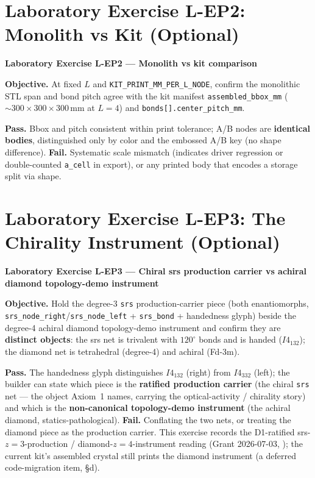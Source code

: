 \section{Laboratory Exercise L-EP2: Monolith vs Kit (Optional)}
\label{sec:vol9_lab_LEP2}

\begin{exercisebox}
\textbf{Laboratory Exercise L-EP2 --- Monolith vs kit comparison}

\textbf{Objective.} At fixed $L$ and \texttt{KIT\_PRINT\_MM\_PER\_L\_NODE}, confirm the monolithic STL span and bond pitch agree with the kit manifest \texttt{assembled\_bbox\_mm} ($\sim\!300\times300\times300\,\mathrm{mm}$ at $L=4$) and \texttt{bonds[].center\_pitch\_mm}.

\textbf{Pass.} Bbox and pitch consistent within print tolerance; A/B nodes are \textbf{identical bodies}, distinguished only by color and the embossed A/B key (no shape difference). \textbf{Fail.} Systematic scale mismatch (indicates driver regression or double-counted \texttt{a\_cell} in export), or any printed body that encodes a storage split via shape.
\end{exercisebox}

\section{Laboratory Exercise L-EP3: The Chirality Instrument (Optional)}
\label{sec:vol9_lab_LEP3}

\begin{exercisebox}
\textbf{Laboratory Exercise L-EP3 --- Chiral srs production carrier vs achiral diamond topology-demo instrument}

\textbf{Objective.} Hold the degree-3 \texttt{srs} production-carrier piece (both enantiomorphs, \texttt{srs\_node\_right}/\texttt{srs\_node\_left} + \texttt{srs\_bond} + handedness glyph) beside the degree-4 achiral diamond topology-demo instrument and confirm they are \textbf{distinct objects}: the srs net is trivalent with $120^\circ$ bonds and is handed ($I4_132$); the diamond net is tetrahedral (degree-4) and achiral (Fd-3m).

\textbf{Pass.} The handedness glyph distinguishes $I4_132$ (right) from $I4_332$ (left); the builder can state which piece is the \textbf{ratified production carrier} (the chiral \texttt{srs} net --- the object Axiom~1 names, carrying the optical-activity / chirality story) and which is the \textbf{non-canonical topology-demo instrument} (the achiral diamond, statics-pathological). \textbf{Fail.} Conflating the two nets, or treating the diamond piece as the production carrier. This exercise records the D1-ratified srs-$z=3$-production / diamond-$z=4$-instrument reading (Grant 2026-07-03, ); the current kit's assembled crystal still prints the diamond instrument (a deferred code-migration item,  §d).
\end{exercisebox}

